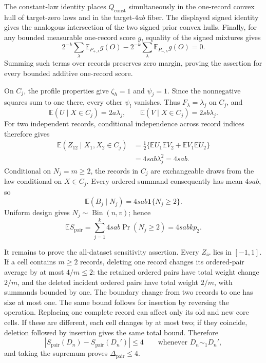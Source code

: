 The constant-law identity places \(Q_{\mathrm{const}}\) simultaneously in the one-record convex hull of target-zero laws and in the target-\(4ab\) fiber.  The displayed signed identity gives the analogous intersection of the two signed prior convex hulls.  Finally, for any bounded measurable one-record score \(g\), equality of the signed mixtures gives
\[
 2^{-k}\sum_\lambda\mathbb E_{P_{+,\lambda}}g(O)
 -2^{-k}\sum_\lambda\mathbb E_{P_{-,\lambda}}g(O)=0.
\]
Summing such terms over records preserves zero margin, proving the assertion for every bounded additive one-record score.

On \(C_j\), the profile properties give \(\zeta_h=1\) and \(\psi_j=1\).  Since the nonnegative squares sum to one there, every other \(\psi_l\) vanishes.  Thus \(F_\lambda=\lambda_j\) on \(C_j\), and
\[
 \mathbb E(U\mid X\in C_j)=2a\lambda_j,
 \qquad
 \mathbb E(V\mid X\in C_j)=2sb\lambda_j.
\]
For two independent records, conditional independence across record indices therefore gives
\[
 \begin{aligned}
 \mathbb E(Z_{12}\mid X_1,X_2\in C_j)
 &=\frac12\{\mathbb E U_1\mathbb E V_2+\mathbb E V_1\mathbb E U_2\}\\
 &=4sab\lambda_j^2=4sab.
 \end{aligned}
\]
Conditional on \(N_j=m\ge2\), the records in \(C_j\) are exchangeable draws from the law conditional on \(X\in C_j\).  Every ordered summand consequently has mean \(4sab\), so
\[
 \mathbb E(B_j\mid N_j)=4sab\mathbf1\{N_j\ge2\}.
\]
Uniform design gives \(N_j\sim\operatorname{Bin}(n,v)\); hence
\[
 \mathbb E S_{\mathrm{pair}}
 =\sum_{j=1}^k4sab\Pr(N_j\ge2)=4sabkp_2.
\]

It remains to prove the all-dataset sensitivity assertion.  Every \(Z_{ir}\) lies in \([-1,1]\).  If a cell contains \(m\ge2\) records, deleting one record changes its ordered-pair average by at most \(4/m\le2\): the retained ordered pairs have total weight change \(2/m\), and the deleted incident ordered pairs have total weight \(2/m\), with summands bounded by one.  The boundary change from two records to one has size at most one.  The same bound follows for insertion by reversing the operation.  Replacing one complete record can affect only its old and new core cells.  If these are different, each cell changes by at most two; if they coincide, deletion followed by insertion gives the same total bound.  Therefore
\[
 |S_{\mathrm{pair}}(D_n)-S_{\mathrm{pair}}(D_n')|\le4
 \qquad\text{whenever }D_n\sim_1D_n',
\]
and taking the supremum proves \(\Delta_{\mathrm{pair}}\le4\).

